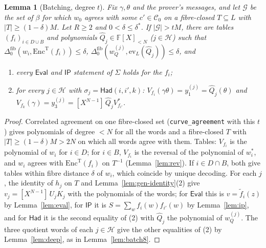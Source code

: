 \documentclass[11pt]{article}
\newtheorem{lemma}[theorem]{Lemma}
\theoremstyle{definition}
\newcommand{\F}{\mathbb{F}}
\newcommand{\coef}[2]{[X^{#1}]\,#2}
\newcommand{\ev}{\mathrm{ev}}
\newcommand{\Cc}{\mathcal{C}}
\begin{document}
\begin{lemma}[Batching, degree $t$]\label{lem:batchT}
Fix $\gamma,\theta$ and the prover's messages, and let $\mathcal G$ be the set of $\beta$ for which $w_0$ agrees with some $c'\in\Cc_0$ on a fibre-closed $T\subseteq L$ with $|T|\ge(1-\delta)M$.
Let $R\ge2$ and $0<\delta\le\delta^\ast$. If $|\mathcal G|>tM$, there are tables $(f_i)_{i\in D\cup B}$ and polynomials $\hat Q_j\in\F[X]_{<N}$ ($j\in\mathcal H$) such that $\Delta^{\mathrm{fib}}_0(w_i,\mathrm{Enc}^{\mathrm T}(f_i))\le\delta$, $\Delta^{\mathrm{fib}}_0(w^{(j)}_Q,\ev_L(\hat Q_j))\le\delta$, and
\begin{enumerate}[nosep]
\item every $\mathsf{Eval}$ and $\mathsf{IP}$ statement of $\Sigma$ holds for the $f_i$;
\item for every $j\in\mathcal H$ with $\sigma_j=\mathsf{Had}(i,i',k)$: $V_{f_i}(\gamma\theta)=y_1^{(j)}=\hat Q_j(\theta)$ and $V_{f_k}(\gamma)=y_3^{(j)}=\coef{N-1}{\hat Q_jV_{f_{i'}}^\ast}$.
\end{enumerate}
\end{lemma}
\begin{proof}
Correlated agreement on one fibre-closed set (\texttt{curve\_agreement} with this $t$) gives polynomials of degree $<N$ for all the words and a fibre-closed $T$ with $|T|\ge(1-\delta)M>2N$ on which all words agree with them.
Tables: $V_{f_i}$ is the polynomial of $w_i$ for $i\in D$; for $i\in B$, $V_{f_i}$ is the reversal of the polynomial of $w_i^\ast$, and $w_i$ agrees with $\mathrm{Enc}^{\mathrm T}(f_i)$ on $T^{-1}$ (Lemma~\ref{lem:rev}). If $i\in D\cap B$, both give tables within fibre distance $\delta$ of $w_i$, which coincide by unique decoding.
For each $j$, the identity of $h_j$ on $T$ and Lemma~\ref{lem:gen-identity}(2) give $v_j=\coef{N-1}{U_jK_j}$ with the polynomials of the words; for $\mathsf{Eval}$ this is $v=\tilde f_i(z)$ by Lemma~\ref{lem:eval}, for $\mathsf{IP}$ it is $S=\sum_wf_i(w)f_{i'}(w)$ by Lemma~\ref{lem:ip}, and for $\mathsf{Had}$ it is the second equality of (2) with $\hat Q_j$ the polynomial of $w_Q^{(j)}$.
The three quotient words of each $j\in\mathcal H$ give the other equalities of (2) by Lemma~\ref{lem:deep}, as in Lemma~\ref{lem:batch8}.
\end{proof}
\end{document}
